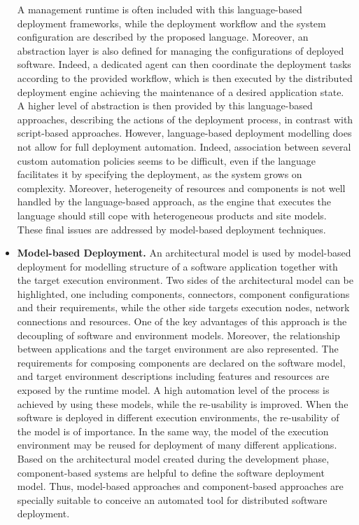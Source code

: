\begin{itemize}
	A management runtime is often included with this language-based deployment frameworks, while the deployment workflow and the system configuration are described by the proposed language.
	Moreover, an abstraction layer is also defined for managing the configurations of deployed software. 
	Indeed, a dedicated agent can then coordinate the deployment tasks according to the provided workflow, which is then executed by the distributed deployment engine achieving the maintenance of a desired application state.
	A higher level of abstraction is then provided by this language-based approaches, describing the actions of the deployment process, in contrast with script-based approaches.
	However, language-based deployment modelling does not allow for full deployment automation.
	Indeed, association between several custom automation policies seems to be difficult, even if the language facilitates it by specifying the deployment, as the system grows on complexity.
	Moreover, heterogeneity of resources and components is not well handled by the language-based approach, as the engine that executes the language should still cope with heterogeneous products and site models.
	These final issues are addressed by model-based deployment techniques.
	
	\item \textbf{Model-based Deployment.} An architectural model is used by model-based deployment for modelling structure of a software application together with the target execution environment.
	Two sides of the architectural model can be highlighted, one including components, connectors, component configurations and their requirements, while the other side targets execution nodes, network connections and resources.
	One of the key advantages of this approach is the decoupling of software and environment models.
	Moreover, the relationship between applications and the target environment are also represented.
	The requirements for composing components are declared on the software model, and target environment descriptions including features and resources are exposed by the runtime model.
	A high automation level of the process is achieved by using these models, while the re-usability is improved.
	When the software is deployed in different execution environments, the re-usability of the model is of importance.
	In the same way, the model of the execution environment may be reused for deployment of many different applications. 
	Based on the architectural model created during the development phase, component-based systems are helpful to define the software deployment model.
	Thus, model-based approaches and component-based approaches are specially suitable to conceive an automated tool for distributed software deployment.
\end{itemize}

